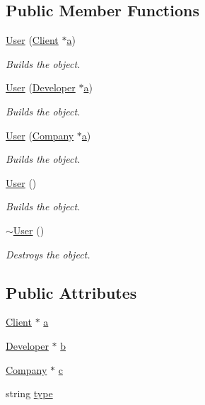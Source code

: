\subsection*{Public Member Functions}
\begin{DoxyCompactItemize}
\item 
\hyperlink{class_user_aef527ddb79c49d20a816b6fb47e577e8}{User} (\hyperlink{class_client}{Client} $\ast$\hyperlink{class_user_ac08da4fbb1ade4e24b4a740a0e0e16b3}{a})
\begin{DoxyCompactList}\small\item\em Builds the object. \end{DoxyCompactList}\item 
\hyperlink{class_user_a49e61f50f0af90eb726b48d46d7c95bf}{User} (\hyperlink{class_developer}{Developer} $\ast$\hyperlink{class_user_ac08da4fbb1ade4e24b4a740a0e0e16b3}{a})
\begin{DoxyCompactList}\small\item\em Builds the object. \end{DoxyCompactList}\item 
\hyperlink{class_user_a2d9eef75b371466137c08e6fef58dc18}{User} (\hyperlink{class_company}{Company} $\ast$\hyperlink{class_user_ac08da4fbb1ade4e24b4a740a0e0e16b3}{a})
\begin{DoxyCompactList}\small\item\em Builds the object. \end{DoxyCompactList}\item 
\hyperlink{class_user_a4a0137053e591fbb79d9057dd7d2283d}{User} ()
\begin{DoxyCompactList}\small\item\em Builds the object. \end{DoxyCompactList}\item 
\hyperlink{class_user_ac00b72ad64eb4149f7b21b9f5468c2b2}{$\sim$\-User} ()
\begin{DoxyCompactList}\small\item\em Destroys the object. \end{DoxyCompactList}\end{DoxyCompactItemize}
\subsection*{Public Attributes}
\begin{DoxyCompactItemize}
\item 
\hyperlink{class_client}{Client} $\ast$ \hyperlink{class_user_ac08da4fbb1ade4e24b4a740a0e0e16b3}{a}
\item 
\hyperlink{class_developer}{Developer} $\ast$ \hyperlink{class_user_ac47b21c64dc1d8b02b6ea50a6194dc13}{b}
\item 
\hyperlink{class_company}{Company} $\ast$ \hyperlink{class_user_a98dcb22d99f74e7be130ebfa7ea4ffc1}{c}
\item 
string \hyperlink{class_user_a96c341b10272580def215fcdccfa0d5e}{type}
\end{DoxyCompactItemize}


